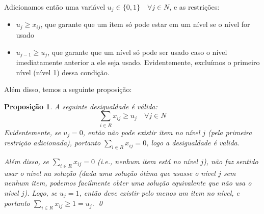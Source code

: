 \documentclass{article}
\newtheorem*{prop}{Proposição}
\begin{document}
Adicionamos então uma variável $u_j \in \{0, 1\} \quad \forall j \in N$, e as restrições:
\begin{itemize}
    \item $u_j \geq x_{ij}$, que garante que um item só pode estar em um nível se o nível for usado
    \item $u_{j-1} \geq u_j$, que garante que um nível só pode ser usado caso o nível imediatamente anterior a ele seja usado. Evidentemente, excluímos o primeiro nível (nível 1) dessa condição.
\end{itemize}

Além disso, temos a seguinte proposição:

\begin{prop}
    A seguinte desigualdade é válida:
    $$\sum_{i \in R} x_{ij} \geq u_j \quad \forall j \in N$$
    \proof
    Evidentemente, se $u_j = 0$, então não pode existir item no nível $j$ (pela primeira restrição adicionada), portanto $\sum_{i \in R} x_{ij} = 0$, logo a desigualdade é valida.

    Além disso, se $\sum_{i \in R} x_{ij} = 0$ (i.e., nenhum item está no nível $j$), não faz sentido usar o nível na solução (dada uma solução ótima que usasse o nível $j$ sem nenhum item, podemos facilmente obter uma solução equivalente que não usa o nível $j$). Logo, se $u_j = 1$, então deve existir pelo menos um item no nível, e portanto $\sum_{i \in R} x_{ij} \geq 1 = u_j$. \qed
\end{prop}
\end{document}
